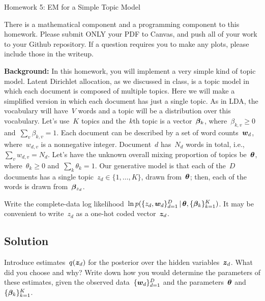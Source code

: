 \documentclass[submit]{harvardml}
\begin{document}
\begin{center}
{\Large Homework 5: EM for a Simple Topic Model}\\
\end{center}

There is a mathematical component and a programming component to this homework.
Please submit ONLY your PDF to Canvas, and push all of your work to your Github
repository. If a question requires you to make any plots, please
include those in the writeup.

\begin{mdframed}[style=exampledefault]
\textbf{Background:} In this homework, you will implement a very simple kind of topic model.  Latent Dirichlet allocation, as we discussed in class, is a topic model in which each document is composed of multiple topics.  Here we will make a simplified version in which each document has just a single topic.  As in LDA, the vocabulary will have~$V$ words and a topic will be a distribution over this vocabulary.  Let's use~$K$ topics and the~$k$th topic is a vector~$\boldsymbol{\beta}_k$, where~${\beta_{k,v}\geq 0}$ and~${\sum_v \beta_{k,v}=1}$.  Each document can be described by a set of word counts~$\boldsymbol{w}_{d}$, where~$w_{d,v}$ is a nonnegative integer.  Document~$d$ has~$N_d$ words in total, i.e.,~${\sum_v w_{d,v}=N_d}$.  Let's have the unknown overall mixing proportion of topics be~$\boldsymbol{\theta}$, where~${\theta_k\geq 0}$ and~${\sum_k\theta_k=1}$.  Our generative model is that each of the~$D$ documents has a single topic~${z_d\in \{1,\ldots,K\}}$, drawn from~$\boldsymbol{\theta}$; then, each of the words is drawn from~$\boldsymbol{\beta}_{z_d}$.

\end{mdframed}

\begin{problem}

Write the complete-data log likelihood~$\ln p(\{z_d,\boldsymbol{w}_d\}^D_{d=1}\,|\,\boldsymbol{\theta}, \{\boldsymbol{\beta}_k\}^K_{k=1})$. It may be convenient to write~$z_d$ as a one-hot coded vector~$\boldsymbol{z}_d$.


\end{problem}
\subsection*{Solution}


\newpage
\begin{problem}

Introduce estimates~$q(\boldsymbol{z}_d)$ for the posterior over the hidden variables~$\boldsymbol{z}_d$.  What did you choose and why?  Write down how you would determine the parameters of these estimates, given the observed data~$\{\boldsymbol{w}_d\}^D_{d=1}$ and the parameters~$\boldsymbol{\theta}$ and~$\{\boldsymbol{\beta}_k\}^K_{k=1}$.

\end{problem}
\end{document}
